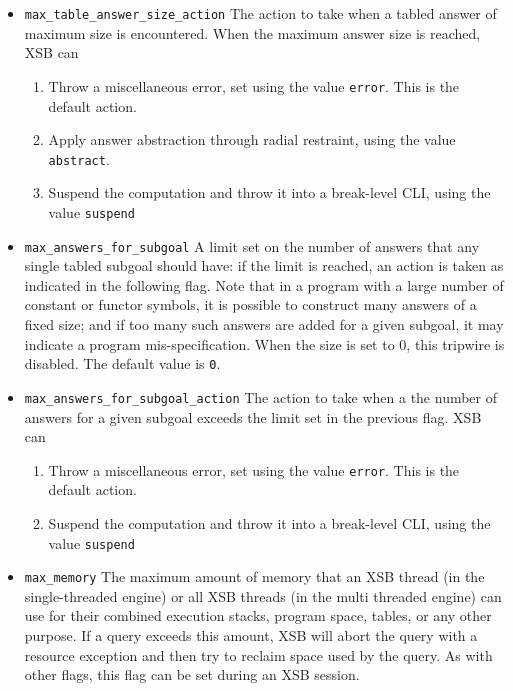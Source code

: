 \begin{description}
\begin{itemize}
\item {\tt max\_table\_answer\_size\_action} The action to take when a
  tabled answer of maximum size is encountered.  When the maximum
  answer size is reached, XSB can
\begin{enumerate}
\item Throw a miscellaneous error, set using the value {\tt error}.
  This is the default action.
%
\item Apply answer abstraction through radial restraint, using the
  value {\tt abstract}.
%
\item Suspend the computation and throw it into a break-level CLI,
  using the value {\tt suspend}
%
\end{enumerate}

\item {\tt max\_answers\_for\_subgoal} A limit set on the number of
  answers that any single tabled subgoal should have: if the limit is
  reached, an action is taken as indicated in the following flag.
  Note that in a program with a large number of constant or functor
  symbols, it is possible to construct many answers of a
  fixed size; and if too many such answers are added for a given
  subgoal, it may indicate a program mis-specification.  When the size
  is set to 0, this tripwire is disabled.  The default value is
  {\tt 0}.

\item {\tt max\_answers\_for\_subgoal\_action} The action to take when
  a the number of answers for a given subgoal exceeds the limit set in
  the previous flag.  XSB can
\begin{enumerate}
\item Throw a miscellaneous error, set using the value {\tt error}.
  This is the default action.
%
\item Suspend the computation and throw it into a break-level CLI,
  using the value {\tt suspend}
%
\end{enumerate}

\item {\tt max\_memory} The maximum amount of memory that an XSB
  thread (in the single-threaded engine) or all XSB threads (in the
  multi threaded engine) can use for their combined execution stacks,
  program space, tables, or any other purpose.  If a query exceeds
  this amount, XSB will abort the query with a resource exception and
  then try to reclaim space used by the query.  As with other flags,
  this flag can be set during an XSB session.


\end{itemize}
\end{description}
